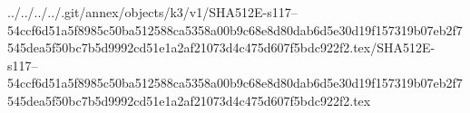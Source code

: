 ../../../../.git/annex/objects/k3/v1/SHA512E-s117--54ccf6d51a5f8985c50ba512588ca5358a00b9c68e8d80dab6d5e30d19f157319b07eb2f7545dea5f50bc7b5d9992cd51e1a2af21073d4c475d607f5bdc922f2.tex/SHA512E-s117--54ccf6d51a5f8985c50ba512588ca5358a00b9c68e8d80dab6d5e30d19f157319b07eb2f7545dea5f50bc7b5d9992cd51e1a2af21073d4c475d607f5bdc922f2.tex